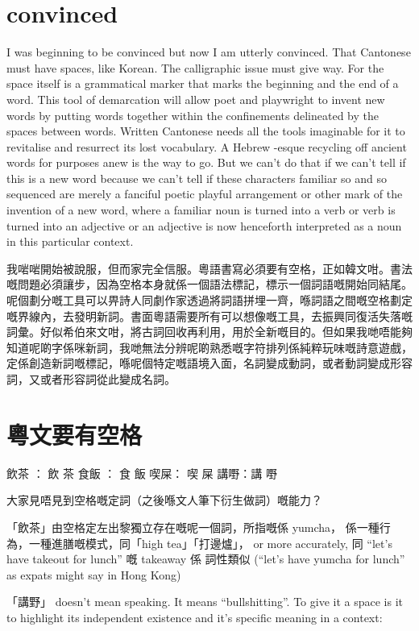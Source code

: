 \section{convinced}
I was beginning to be convinced but now I am utterly convinced. That Cantonese must have spaces, like Korean. The calligraphic issue must give way. For the space itself is a grammatical marker that marks the beginning and the end of a word. This tool of demarcation will allow poet and playwright to invent new words by putting words together within the confinements delineated by the spaces between words. Written Cantonese needs all the tools imaginable for it to revitalise and resurrect its lost vocabulary. A Hebrew -esque recycling off ancient words for purposes anew is the way to go. But we can’t do that if we can’t tell if this is a new word because we can’t tell if these  characters familiar so and so sequenced are merely a fanciful poetic playful arrangement or other mark of the invention of a new word, where a familiar noun is turned into a verb or verb is turned into an adjective or an adjective is now henceforth interpreted as a noun in this particular context.

我啱啱開始被說服，但而家完全信服。粵語書寫必須要有空格，正如韓文咁。書法嘅問題必須讓步，因為空格本身就係一個語法標記，標示一個詞語嘅開始同結尾。呢個劃分嘅工具可以畀詩人同劇作家透過將詞語拼埋一齊，喺詞語之間嘅空格劃定嘅界線內，去發明新詞。書面粵語需要所有可以想像嘅工具，去振興同復活失落嘅詞彙。好似希伯來文咁，將古詞回收再利用，用於全新嘅目的。但如果我哋唔能夠知道呢啲字係咪新詞，我哋無法分辨呢啲熟悉嘅字符排列係純粹玩味嘅詩意遊戲，定係創造新詞嘅標記，喺呢個特定嘅語境入面，名詞變成動詞，或者動詞變成形容詞，又或者形容詞從此變成名詞。






\section{
    粵文要有空格}
    飲茶 ： 飲 茶
食飯 ： 食 飯
喫屎： 喫 屎
講嘢：講 嘢

大家見唔見到空格嘅定詞（之後喺文人筆下衍生做詞）嘅能力？


「飲茶」由空格定左出黎獨立存在嘅呢一個詞，所指嘅係 yumcha， 係一種行為，一種進膳嘅模式，同「high tea」「打邊爐」， or more accurately, 同 “let’s have takeout for lunch” 嘅 takeaway 係 詞性類似 (“let’s have yumcha for lunch” as expats might say in Hong Kong) 

「講野」 doesn’t mean speaking. It means “bullshitting”. To give it a space is it to highlight its independent existence and it’s specific meaning in a context: 

